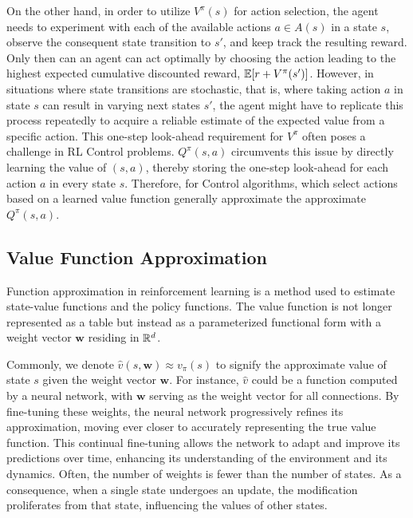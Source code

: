 On the other hand, in order to utilize $V^{\pi}(s)$ for action selection, the agent needs to experiment with each of the available actions $a \in A(s)$ in a state $s$, observe the consequent state transition to $s'$, and keep track the resulting reward. Only then can an agent can act optimally by choosing the action leading to the highest expected cumulative discounted reward,  $\mathbb E[r + V^{\pi}(s')]$. 
However, in situations where state transitions are stochastic, that is, where taking action $a$ in state $s$ can result in varying next states $s'$, the agent might have to replicate this process repeatedly to acquire a reliable estimate of the expected value from a specific action. This one-step look-ahead requirement for $V^{\pi}$ often poses a challenge in RL Control problems. $Q^{\pi}(s,a)$ circumvents this issue by directly learning the value of $(s,a)$, thereby storing the one-step look-ahead for each action $a$ in every state $s$. Therefore, for Control algorithms, which select actions based on a learned value function generally approximate the approximate $Q^{\pi}(s,a)$.

\subsection{Value Function Approximation}
Function approximation in reinforcement learning is a method used to estimate state-value functions and the policy functions.
The value function is not longer represented as a table but instead as a parameterized functional form with a weight vector $\mathbf{w}$ residing in $\mathbb R^d$.

Commonly, we denote $\hat{v}(s, \mathbf{w}) \approx v_{\pi}(s)$ to signify the approximate value of state $s$ given the weight vector $\mathbf{w}$. For instance, $\hat{v}$ could be a function computed by a neural network, with $\mathbf{w}$ serving as the weight vector for all connections. By fine-tuning these weights, the neural network progressively refines its approximation, moving ever closer to accurately representing the true value function. This continual fine-tuning allows the network to adapt and improve its predictions over time, enhancing its understanding of the environment and its dynamics.
Often, the number of weights is fewer than the number of states. As a consequence, when a single state undergoes an update, the modification proliferates from that state, influencing the values of other states.


